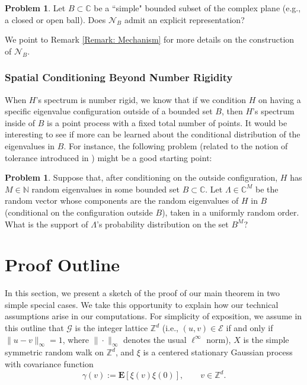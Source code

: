 \documentclass{amsart}
\numberwithin{equation}{section}
\theoremstyle{definition}
\newtheorem{problem}[theorem]{Problem}
\newcommand\ga{\gamma}
\newcommand\La{\Lambda}
\newcommand\mbb{\mathbb}
\newcommand\mbf{\mathbf}
\newcommand\mc{\mathcal}
\newcommand\ms{\mathscr}
\begin{document}
%

\begin{problem}
Let $B\subset\mbb C$ be a ``simple" bounded subset of the complex plane
(e.g., a closed or open ball).
Does $\mc N_B$ admit an explicit representation?
\end{problem}

%

We point to Remark \ref{Remark: Mechanism} for more details on the construction of $\mc N_B$.

%

\subsubsection{Spatial Conditioning Beyond Number Rigidity}

%

When $H$'s spectrum is number rigid, we know that if we condition
$H$ on having a specific eigenvalue configuration outside of a bounded set
$B$, then $H$'s spectrum inside of $B$ is a point process with a fixed total number
of points. It would be interesting to see if more can be learned about
the conditional distribution of the eigenvalues in $B$. For instance, the
following problem (related to the notion of tolerance introduced in
\cite{GP17}) might be a good starting point:

%

\begin{problem}
Suppose that, after conditioning on the outside configuration,
$H$ has $M\in\mbb N$ random eigenvalues in some bounded
set $B\subset\mbb C$. Let $\La\in\mbb C^M$ be the random
vector whose components are the random eigenvalues of $H$ in $B$
(conditional on the configuration outside $B$),
taken in a uniformly random order. What is the support of $\La$'s
probability distribution on the set $B^M$?
\end{problem}

%

\section{Proof Outline}
\label{Section: Outline}

%

In this section, we present a sketch of the proof of
our main theorem in two simple special cases.
We take this opportunity to explain how our technical
assumptions arise in our computations.
For simplicity of exposition, we assume in this outline that $\ms G$ is the integer lattice
$\mbb Z^d$ (i.e., $(u,v)\in\ms E$ if and only if $\|u-v\|_\infty=1$, where $\|\cdot\|_\infty$ denotes the
usual $\ell^\infty$ norm), $X$ is the simple
symmetric random walk on $\mbb Z^d$, and $\xi$ is a centered stationary Gaussian process
with covariance function
\[\ga(v):=\mbf E[\xi(v)\xi(0)],\qquad v\in\mbb Z^d.\]
\end{document}
